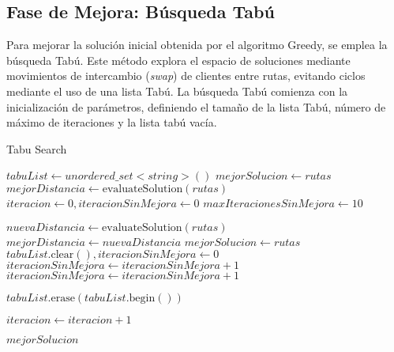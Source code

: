 \documentclass[letter, 10pt]{article}
\begin{document}
\subsection{Fase de Mejora: Búsqueda Tabú}

Para mejorar la solución inicial obtenida por el algoritmo Greedy, se emplea la búsqueda Tabú. Este método explora el espacio de soluciones mediante movimientos de intercambio (\textit{swap}) de clientes entre rutas,  evitando ciclos mediante el uso de una lista Tabú. La búsqueda Tabú comienza con la inicialización de parámetros, definiendo el tamaño de la lista Tabú, número de máximo de iteraciones y la lista tabú vacía.

\begin{algorithm}[H]
\caption{Tabu Search}
\begin{algorithmic}[1]
        \State $tabuList \gets unordered\_set<string>()$
        \State $mejorSolucion \gets rutas$
        \State $mejorDistancia \gets \text{evaluateSolution}(rutas)$
        \State $iteracion \gets 0, iteracionSinMejora \gets 0$
        \State $maxIteracionesSinMejora \gets 10$

                \State $nuevaDistancia \gets \text{evaluateSolution}(rutas)$
                    \State $mejorDistancia \gets nuevaDistancia$
                    \State $mejorSolucion \gets rutas$
                    \State $tabuList.\text{clear}(), iteracionSinMejora \gets 0$
                \Else
                    \State $iteracionSinMejora \gets iteracionSinMejora + 1$
                \EndIf
            \Else
                \State $iteracionSinMejora \gets iteracionSinMejora + 1$
            \EndIf

                \State $tabuList.\text{erase}(tabuList.\text{begin}())$
            \EndIf

            \State $iteracion \gets iteracion + 1$
        \EndWhile

        \State \Return $mejorSolucion$
    \EndFunction
\end{algorithmic}
\end{algorithm}
\end{document}
